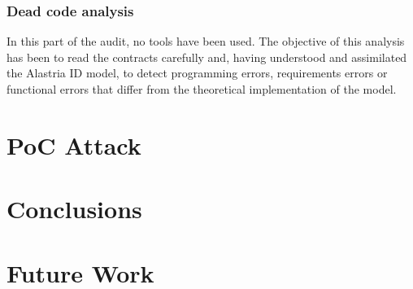 \documentclass[a4paper, 12pt]{article} %
\begin{document}
        \subsubsection{Dead code analysis}
            In this part of the audit, no tools have been used. The objective of this analysis has been to read the contracts carefully and, having understood and assimilated the Alastria ID model, to detect programming errors, requirements errors or functional errors that differ from the theoretical implementation of the model.




\newpage
\section{PoC Attack}


\newpage
\section{Conclusions}

\newpage
\section{Future Work}
\newpage
\printbibliography[heading=bibnumbered] %
\end{document}
